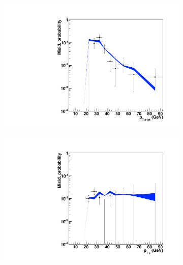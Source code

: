 \begin{figure}
        \centering
        \begin{subfigure}[b]{0.33\textwidth}
		\includegraphics[width=\textwidth]{4_Analisys/pics/8TeV/plots/fakerates/m_mmt_leading_kNN_muonJetPt.pdf}
                \caption{}
        \end{subfigure}%
        \begin{subfigure}[b]{0.33\textwidth}
                \includegraphics[width=\textwidth]{4_Analisys/pics/8TeV/plots/fakerates/m_mmt_leading_kNN_muonPt.pdf}
                \caption{}
        \end{subfigure}
        \begin{subfigure}[b]{0.33\textwidth}

\end{subfigure}
\end{figure}
